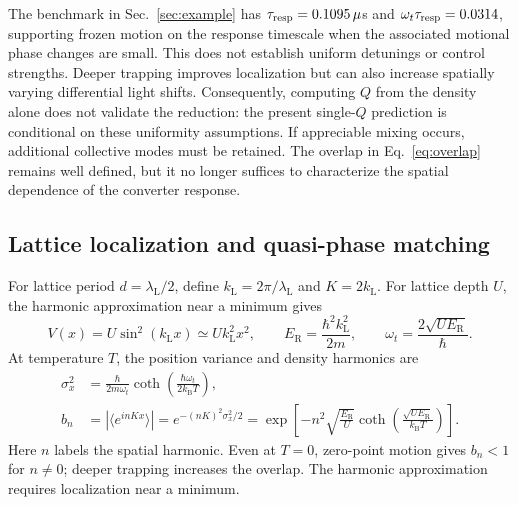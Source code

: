 \documentclass[aps,pra,onecolumn,10pt,letterpaper,notitlepage,nofootinbib,amsmath,amssymb]{revtex4-2}
\newcommand{\kb}{k_{\mathrm B}}
\newcommand{\ER}{E_{\mathrm R}}
\newcommand{\kL}{k_{\mathrm L}}
\begin{document}
The benchmark in Sec.~\ref{sec:example} has
$\tau_{\rm resp}=0.1095\,\mu$s and $\omega_t\tau_{\rm resp}=0.0314$, supporting
frozen motion on the response timescale when the associated motional phase
changes are small. This does not establish uniform detunings or control
strengths. Deeper trapping improves localization but can also increase
spatially varying differential light shifts. Consequently, computing $Q$ from
the density alone does not validate the reduction: the present single-$Q$
prediction is conditional on these uniformity assumptions. If appreciable
mixing occurs, additional collective modes must be retained. The overlap in
Eq.~\eqref{eq:overlap} remains well defined, but it no longer suffices to
characterize the spatial dependence of the converter response.

\subsection{Lattice localization and quasi-phase matching}
\label{sec:lattice-localization}
For lattice period $d=\lambda_{\mathrm L}/2$, define $\kL=2\pi/\lambda_{\mathrm L}$
and $K=2\kL$. For lattice depth $U$, the harmonic approximation near a minimum gives~\cite{bloch}
\begin{equation}
 V(x)=U\sin^2(\kL x)\simeq U\kL^2x^2,\qquad
 \ER=\frac{\hbar^2\kL^2}{2m},\qquad
 \omega_t=\frac{2\sqrt{U\ER}}{\hbar}.
 \label{eq:trap}
\end{equation}
At temperature $T$, the position variance and density harmonics are
\begin{align}
 \sigma_x^2&=\frac{\hbar}{2m\omega_t}
       \coth\!\left(\frac{\hbar\omega_t}{2\kb T}\right),\nonumber\\
 b_n&=|\langle e^{inKx}\rangle|
 =e^{-(nK)^2\sigma_x^2/2}
 =\exp\!\left[-n^2\sqrt{\frac{\ER}{U}}
       \coth\!\left(\frac{\sqrt{U\ER}}{\kb T}\right)\right].
 \label{eq:bn}
\end{align}
Here $n$ labels the spatial harmonic. Even at $T=0$, zero-point motion gives
$b_n<1$ for $n\ne0$; deeper trapping increases the overlap. The harmonic approximation
requires localization near a minimum.
\end{document}
